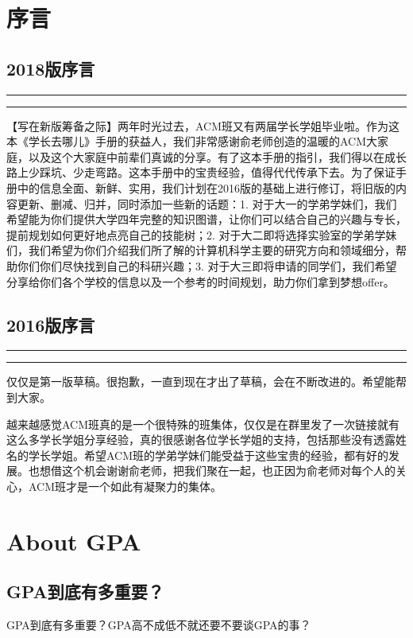 \documentclass{vivid_layout}
\begin{document}
\tableofcontents	%


\section{序言}
\addtocounter{section}{0}

\subsection*{2018版序言}
\hrule\hrule

【写在新版筹备之际】两年时光过去，ACM班又有两届学长学姐毕业啦。作为这本《学长去哪儿》手册的获益人，我们非常感谢俞老师创造的温暖的ACM大家庭，以及这个大家庭中前辈们真诚的分享。有了这本手册的指引，我们得以在成长路上少踩坑、少走弯路。这本手册中的宝贵经验，值得代代传承下去。为了保证手册中的信息全面、新鲜、实用，我们计划在2016版的基础上进行修订，将旧版的内容更新、删减、归并，同时添加一些新的话题：1. 对于大一的学弟学妹们，我们希望能为你们提供大学四年完整的知识图谱，让你们可以结合自己的兴趣与专长，提前规划如何更好地点亮自己的技能树；2. 对于大二即将选择实验室的学弟学妹们，我们希望为你们介绍我们所了解的计算机科学主要的研究方向和领域细分，帮助你们你们尽快找到自己的科研兴趣；3. 对于大三即将申请的同学们，我们希望分享给你们各个学校的信息以及一个参考的时间规划，助力你们拿到梦想offer。

\subsection*{2016版序言}
\hrule\hrule

仅仅是第一版草稿。很抱歉，一直到现在才出了草稿，会在不断改进的。希望能帮到大家。

越来越感觉ACM班真的是一个很特殊的班集体，仅仅是在群里发了一次链接就有这么多学长学姐分享经验，真的很感谢各位学长学姐的支持，包括那些没有透露姓名的学长学姐。希望ACM班的学弟学妹们能受益于这些宝贵的经验，都有好的发展。也想借这个机会谢谢俞老师，把我们聚在一起，也正因为俞老师对每个人的关心，ACM班才是一个如此有凝聚力的集体。


\newpage

\section{About GPA}
\addtocounter{section}{1}
\setcounter{subsection}{0}

\subsection{GPA到底有多重要？}
GPA到底有多重要？GPA高不成低不就还要不要谈GPA的事？
\end{document}

